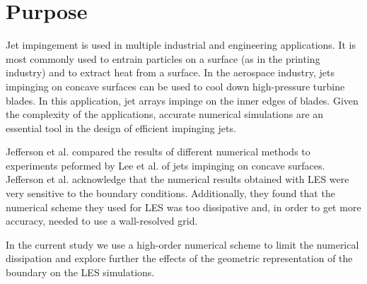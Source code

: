 \section{Purpose}
       Jet impingement is used in multiple industrial and engineering applications. It is most commonly used to entrain particles on a surface (as in the printing industry) and to extract heat from a surface. In the aerospace industry, jets impinging on concave surfaces can be used to cool down high-pressure turbine blades\cite{han2001}. In this application, jet arrays impinge on the inner edges of blades. Given the complexity of the applications, accurate numerical simulations are an essential tool in the design of efficient impinging jets.

Jefferson et al. \cite{jefferson2010} compared the results of different numerical methods to experiments peformed by Lee et al. \cite{lee1997} of jets impinging on concave surfaces. Jefferson et al. acknowledge that the numerical results obtained with LES were very sensitive to the boundary conditions. Additionally, they found that the numerical scheme they used for LES was too dissipative and, in order to get more accuracy, needed to use a wall-resolved grid.

In the current study we use a high-order numerical scheme to limit the numerical dissipation and explore further the effects of the geometric representation of the boundary on the LES simulations.



